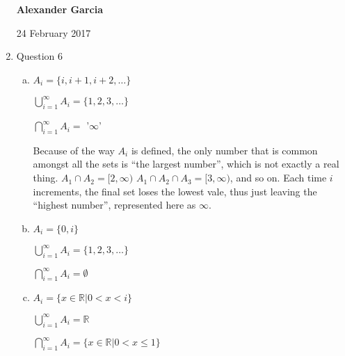 \documentclass[11pt]{article}
\begin{document}
\begin{enumerate}
		\newpage

		\textbf{Alexander Garcia}

		24 February 2017 \\

	\item Question 6

		\begin{enumerate}[(a)]
				
		\item $A_i = \{i, i + 1, i + 2, \dots\}$

			$\bigcup\limits_{i = 1}^{\infty} A_i = \{1, 2, 3, \dots\}$

			$\bigcap\limits_{i = 1}^{\infty} A_i =$ '$\infty$'  

			Because of the way $A_i$ is defined, the only number that is common amongst all the sets
			is ``the largest number'', which is not exactly a real thing. $A_1 \cap A_2 = [2, \infty)$
			$A_1 \cap A_2 \cap A_3 = [3, \infty)$, and so on. Each time $i$ increments, the final set loses
			the lowest vale, thus just leaving the ``highest number'', represented here as $\infty$.

		\item $A_i = \{0, i\}$ 

			$\bigcup\limits_{i = 1}^{\infty} A_i = \{1, 2, 3, \dots\}$

			$\bigcap\limits_{i = 1}^{\infty} A_i = \emptyset$

		\item $A_i = \{x \in \mathbb{R} | 0 < x < i\}$

			$\bigcup\limits_{i = 1}^{\infty} A_i = \mathbb{R}$

			$\bigcap\limits_{i = 1}^{\infty} A_i = \{x \in \mathbb{R} | 0 < x \leq 1\}$

		\end{enumerate}

\end{enumerate}
\end{document}
